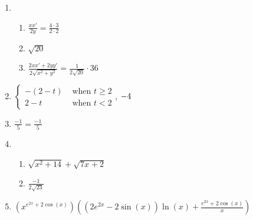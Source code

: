 \documentclass[12pt,twoside]{article}
\makeatletter
\def\emptycleardoublepage{\clearpage\if@twoside \ifodd\c@page\else
\thispagestyle{empty}%
\hbox{}\newpage\if@twocolumn\hbox{}\newpage\fi\fi\fi}
\makeatother
\begin{document}
\begin{multicols}{2}
\begin{enumerate}
\def \b{2}\def \x{4}\def \y{2}\def \xchange{3}\def \ratrhs{8}\def \cirrhs{24}\def \hyprhs{8}\def \compy{2y^{2}}\def \ychangenum{6}\def \dist{20}\def \fracrat{18}\def \fraccirc{12}\def \frachyp{36}
\item \begin{enumerate}
\item $\frac{xx'}{\b y} = \frac{\x \cdot \xchange}{\b \cdot \y}$
\item $\sqrt{\dist}$
\item $\frac{2xx'+2yy'}{2\sqrt{x^2+y^2}} = \frac{1}{2\sqrt{\dist}} \cdot \frachyp$
\end{enumerate}
\def \a{2}\def \k{4}\def \abstop{0}\def \ktop{1}
\item $\begin{cases} -(\a -t) & \text{ when } t \geq \a \\ \a-t & \text{ when } t < \a \end{cases}$, $\ifthenelse{\ktop=1}{-\k}{-\frac{1}{\k}}$
\def \a{1}\def \b{2}\def \k{5}\def \fancyp{x^{2}-3x^{}+2}\def \simplep{5x^{}-5}\def \fancyreduced{-1}\def \niceanstop{\frac{-1}{5}}\def \niceansbottom{-5}
\item $\frac{\fancyreduced}{\k} = \niceanstop$
\def \a{3}\def \b{4}\def \ab{12}\def \c{14}\def \amb{-1}\def \ansroot{23}\def \firstroot{x^{2}+14}\def \secondroot{7x^{}+2}\def \porm{-1}
\item \begin{enumerate}
\item $\sqrt{\firstroot} + \sqrt{\secondroot}$
\item $\frac{\amb}{2\sqrt{\ansroot}}$
\end{enumerate}
\def \varexp{2}\def \newexp{1}\def \trigcoeff{2}\def \trigval{+2}\def \oppval{-2}
\item $(x^{e^{\varexp x} \trigval \cos(x)}) \left( (\varexp e^{\varexp x} \oppval \sin(x))\ln(x) + \frac{e^{\varexp x} \trigval \cos(x)}{x} \right)$
 \end{enumerate}\end{multicols}\emptycleardoublepage{}\graphicspath{{C:/Users/iainc/anaconda3/Randomizer/MATH 1001/Midterm 1/}}\begin{multicols}{2} \begin{enumerate}\def \a{-6}\def \b{7}\def \c{-5}\def \d{1}\def \negb{-7}\def \negc{5}\def \determ{29}\def \ansa{\frac{1}{29}}\def \ansb{\frac{-7}{29}}\def \ansc{\frac{5}{29}}\def \ansd{\frac{-6}{29}}

\end{enumerate}
\end{multicols}
\end{document}
